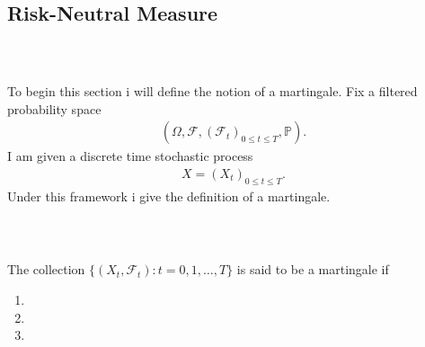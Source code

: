\documentclass{beamer}
\numberwithin{equation}{section}
\begin{document}
\subsection{Risk-Neutral Measure}

\begin{frame}\frametitle{{\normalsize \secname} \\ {\large \subsecname}}
    To begin this section i will define the notion of a martingale.
    Fix a filtered probability space
    \begin{align}
        \left(
            \Omega,
            \mathscr{F},
            \left(
                \mathscr{F}_t
            \right)_{0 \leq t \leq T},
            \mathbb{P}
        \right).
    \end{align}
    I am given a discrete time stochastic process
    \begin{align}
        X = (X_t)_{0 \leq t \leq T}.
    \end{align}
    Under this framework i give the definition of a martingale.
\end{frame}

\begin{frame}\frametitle{{\normalsize \secname} \\ {\large \subsecname}}
    \begin{definition}[Martingale]\label{def:martingale}
        The collection $\{ (X_t, \mathscr{F}_t): t = 0,1, \ldots, T \}$ is said to be a martingale if
        \begin{enumerate}
            \item %
            \item %
            \item %
        \end{enumerate}
    \end{definition}
\end{frame}
\end{document}
